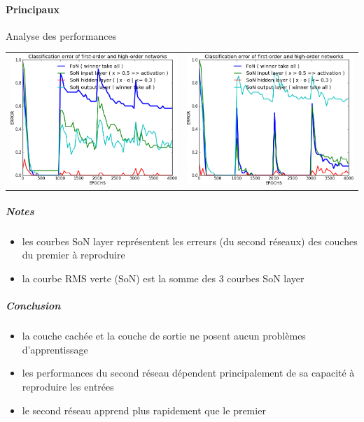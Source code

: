     \paragraph{Principaux}
      Analyse des performances
      \begin{center}
	\begin{tabular}{lr}
	  \hspace*{-1cm}
	  \includegraphics[width=250px]{data/expB1/err.png}
	  &
	  \includegraphics[width=250px]{data/expB1/err_block.png} 
	\end{tabular}
      \end{center}
      \subparagraph{Notes}
	\begin{itemize}
	  \item les courbes SoN layer représentent les erreurs (du second réseaux) des couches du premier à reproduire 
	  \item la courbe RMS verte (SoN) est la somme des 3 courbes SoN layer
	\end{itemize}
      \subparagraph{Conclusion}
	\begin{itemize}
	  \item la couche cachée et la couche de sortie ne posent aucun problèmes d'apprentissage
	  \item les performances du second réseau dépendent principalement de sa capacité à reproduire les entrées
	  \item le second réseau apprend plus rapidement que le premier
	\end{itemize}
